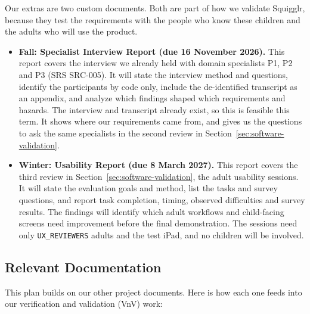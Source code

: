 \documentclass[12pt, titlepage]{article}
\begin{document}
Our extras are two custom documents. Both are part of how we validate
Squigglr, because they test the requirements with the people who know these
children and the adults who will use the product.
\begin{itemize}
  \item \textbf{Fall: Specialist Interview Report (due 16 November 2026).} This
    report covers the interview we already held with domain specialists P1, P2
    and P3 (SRS SRC-005). It will state the interview method and questions,
    identify the participants by code only, include the de-identified transcript
    as an appendix, and analyze which findings shaped which requirements and
    hazards. The interview and transcript already exist, so this is feasible
    this term. It shows where our requirements came from, and gives us the
    questions to ask the same specialists in the second review in
    Section~\ref{sec:software-validation}.
  \item \textbf{Winter: Usability Report (due 8 March 2027).} This report covers
    the third review in Section~\ref{sec:software-validation}, the adult usability
    sessions. It will state the evaluation goals and method, list the tasks and
    survey questions, and report task completion, timing, observed difficulties
    and survey results. The findings will identify which adult workflows and
    child-facing screens need improvement before the final demonstration. The
    sessions need only \texttt{UX\_REVIEWERS} adults and the test iPad, and no
    children will be involved.
\end{itemize}

\subsection{Relevant Documentation}
\label{sec:relevant-docs}

This plan builds on our other project documents. Here is how each one feeds
into our verification and validation (VnV) work:
\end{document}
